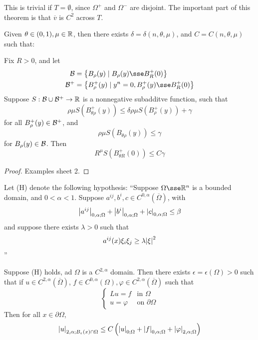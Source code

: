 \documentclass{article}
\begin{document}
\begin{remark}
    This is trivial if \(T = \emptyset\), since \(\Omega^+\) and \(\Omega^-\) are disjoint. The important part of this theorem is that \(\overline v\) is \(C^2\) across \(T\). 
\end{remark}

\begin{proposition}
     Given \(\theta \in (0, 1), \mu \in \mathbb{R}\), then there exists \(\delta = \delta(n, \theta, \mu)\), and \(C = C(n, \theta, \mu)\) such that:

    Fix \(R > 0\), and let
    \begin{align*}
        \mcB &= \left\{B_\rho(y) \mid B_\rho(y) \sse B_R^+(0)\right\} \\
        \mcB^+ &= \left\{B^+_\rho(y) \mid y^n = 0, B^+_\rho(y) \sse B_R^+(0)\right\}
    \end{align*}
    Suppose \(S : \mathcal{B} \cup \mathcal{B}^+ \to \mathbb{R}\) is a nonnegative subadditve function, such that
    \[\rho\mu S(B_{\theta\rho}^+(y)) \le \delta\rho\mu S(B_\rho^+(y)) + \gamma\]
    for all \(B_\rho^+(y) \in \mathcal{B}^+\), and
    \[\rho\mu S(B_{\theta\rho}(y)) \le \gamma\]
    for \(B_\rho(y) \in \mathcal{B}\). Then
    \[R^\mu S(B_{\theta R}^+(0)) \le C\gamma\]
\end{proposition}

\begin{proof}
    Examples sheet 2.
\end{proof}

\lec

Let (H) denote the following hypothesis: ``Suppose \(\Omega \sse \R^n\) is a bounded domain, and \(0 < \alpha < 1\). Suppose \(a^{ij}, b^i, c \in C^{0, \alpha}(\overline\Omega)\), with
\[\abs{a^{ij}}_{0, \alpha; \Omega} + \abs{b^i}_{0, \alpha; \Omega} + \abs{c}_{0, \alpha; \Omega} \le \beta\]
and suppose there exists \(\lambda > 0\) such that
\[a^{ij}(x)\xi_i\xi_j \ge \lambda\abs{\xi}^2\]''

\begin{theorem}

    Suppose (H) holds, ad \(\Omega\) is a \(C^{2, \alpha}\) domain. Then there exists \(\epsilon = \epsilon(\Omega) > 0\) such that if \(u \in C^{2, \alpha}(\overline\Omega)\), \(f \in C^{0, \alpha}(\Omega), \varphi \in C^{2, \alpha}(\overline\Omega)\) such that
    \[\begin{cases}
        Lu = f &\text{in }\Omega \\
        u = \varphi&\text{on }\partial\Omega
    \end{cases}\]
    Then for all \(x \in \partial\Omega\),
    \[\abs{u}_{2, \alpha; B_\varepsilon(x) \cap \Omega} \le C\left(\abs{u}_{0; \Omega} + \abs{f}_{0, \alpha; \Omega} + \abs{\varphi}_{2, \alpha; \Omega}\right)\]
\end{theorem}
\end{document}
